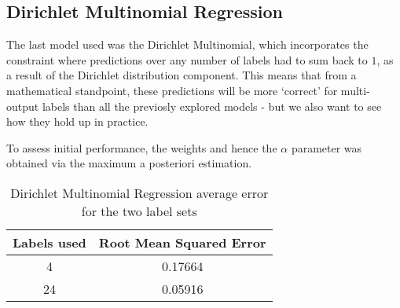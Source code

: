 \subsection{Dirichlet Multinomial Regression}

The last model used was the Dirichlet Multinomial, which incorporates the constraint where predictions over any number of labels had to sum back to $1$, as a result of the Dirichlet distribution component. This means that from a mathematical standpoint, these predictions will be more `correct' for multi-output labels than all the previosly explored models - but we also want to see how they hold up in practice.

To assess initial performance, the weights and hence the $\alpha$ parameter was obtained via the maximum a posteriori estimation.



\begin{table}[H]
    \centering
    \begin{tabular}{|c|c|}
        \hline
        Labels used & Root Mean Squared Error \\\hline
        4 & 0.17664\\
        24  & 0.05916\\
        \hline
    \end{tabular}
    \label{table:dmbasicresults}
    \caption{Dirichlet Multinomial Regression average error for the two label sets}
\end{table}

